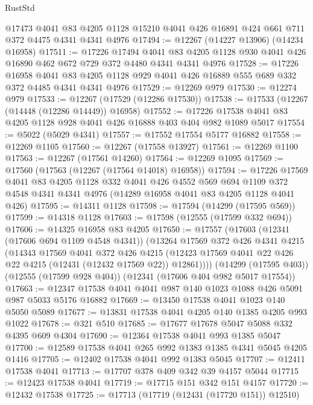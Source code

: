 \begin{lexlean}{RustStd}
\begin{coremodule}
    @17473
    @4041
    @83
    @4205
    @1128
    @15210
    @4041
    @426
    @16891
    @424
    @661
    @711
    @372
    @4475
    @4341
    @4341
    @4976
@17494 := @12267 (@14227 @13906) (@14234 @16958)
@17511 := @17226
    @17494
    @4041
    @83
    @4205
    @1128
    @930
    @4041
    @426
    @16890
    @462
    @672
    @729
    @372
    @4480
    @4341
    @4341
    @4976
@17528 := @17226
    @16958
    @4041
    @83
    @4205
    @1128
    @929
    @4041
    @426
    @16889
    @555
    @689
    @332
    @372
    @4485
    @4341
    @4341
    @4976
@17529 := @12269 @979
@17530 := @12274 @979
@17533 := @12267 (@17529 (@12286 @17530))
@17538 := @17533 (@12267 (@14448 (@12286 @14449)) @16958)
@17552 := @17226 @17538 @4041 @83 @4205 @1128 @928 @4041 @426 @16888 @403 @404 @982 @1089 @5017
@17554 := @5022 (@5029 @4341)
@17557 := @17552 @17554 @5177 @16882
@17558 := @12269 @1105
@17560 := @12267 (@17558 @13927)
@17561 := @12269 @1100
@17563 := @12267 (@17561 @14260)
@17564 := @12269 @1095
@17569 := @17560 (@17563 (@12267 (@17564 @14018) @16958))
@17594 := @17226
    @17569
    @4041
    @83
    @4205
    @1128
    @332
    @4041
    @426
    @4552
    @569
    @694
    @1109
    @372
    @4548
    @4341
    @4341
    @4976
    (@14289 @16958 @4041 @83 @4205 @1128 @4041 @426)
@17595 := @14311 @1128
@17598 := @17594 (@14299 (@17595 @569))
@17599 := @14318 @1128
@17603 := @17598 (@12555 (@17599 @332 @694))
@17606 := @14325 @16958 @83 @4205
@17650 := @17557
    (@17603
      (@12341 (@17606 @694 @1109 @4548 @4341))
      (@13264
        @17569
        @372
        @426
        @4341
        @4215
        (@14343
          @17569
          @4041
          @372
          @426
          @4215
          (@12423 @17569 @4041 @22 @426 @22 @4215 (@12431 (@12432 @17569 @22)) @12861))))
    (@14299 (@17595 @403))
    (@12555 (@17599 @928 @404))
    (@12341 (@17606 @404 @982 @5017 @17554))
@17663 := @12347 @17538 @4041 @4041 @987 @140 @1023 @1088 @426 @5091 @987 @5033 @5176 @16882
@17669 := @13450 @17538 @4041 @1023 @140 @5050 @5089
@17677 := @13831 @17538 @4041 @4205 @140 @1385 @4205 @993 @1022
@17678 := @321 @510
@17685 := @17677 @17678 @5047 @5088 @332 @4395 @609 @4304
@17690 := @12364 @17538 @4041 @993 @1385 @5047
@17700 := @12589 @17538 @4041 @265 @992 @1383 @1385 @4341 @5045 @4205 @1416
@17705 := @12402 @17538 @4041 @992 @1383 @5045
@17707 := @12411 @17538 @4041
@17713 := @17707 @378 @409 @342 @39 @4157 @5044
@17715 := @12423 @17538 @4041
@17719 := @17715 @151 @342 @151 @4157
@17720 := @12432 @17538
@17725 := @17713 (@17719 (@12431 (@17720 @151)) @12510)

\end{coremodule}
\end{lexlean}
